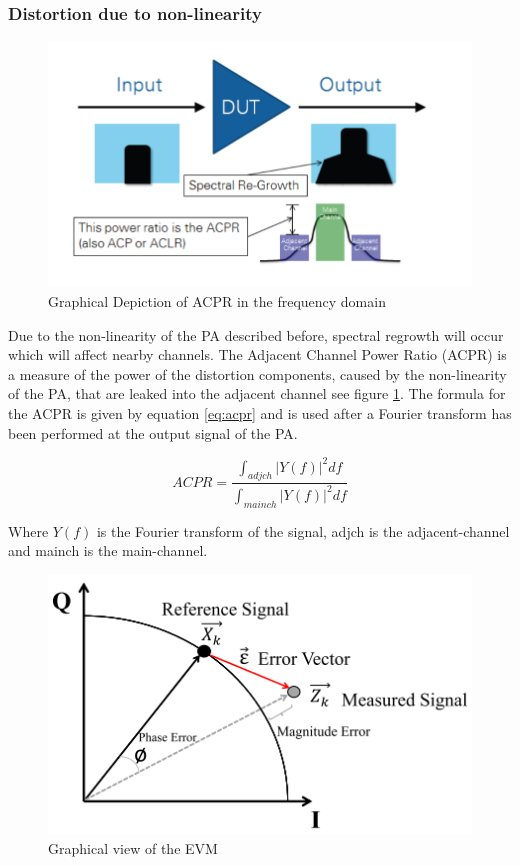 \subsubsection{Distortion due to non-linearity}

\begin{figure}[H]
\centering 
\includegraphics[scale = 0.5]{figures/ch1/acpr.png}
\caption{Graphical Depiction of ACPR in the frequency domain \citep{NI}}
\label{fig:acpr}
\end{figure}

Due to the non-linearity of the PA described before, spectral regrowth will occur which will affect nearby channels. The Adjacent Channel Power Ratio (ACPR) is a measure of the power of the distortion components, caused by the non-linearity of the PA, that are leaked into the adjacent channel see figure \ref{fig:acpr}. The formula for the ACPR is given by equation \ref{eq:acpr} and is used after a Fourier transform has been performed at the output signal of the PA.

\begin{equation} \label{eq:acpr}
	ACPR = \frac{\int_{adjch}^{} |Y(f)|^2 df }{\int_{mainch}^{} |Y(f)|^2 df}
\end{equation}   

Where $Y(f)$ is the Fourier transform of the signal, adjch is the adjacent-channel and mainch is the main-channel. 

\begin{figure}[H]
\centering 
\includegraphics[scale = 0.8]{figures/ch1/evm.png}
\caption{Graphical view of the EVM}
\label{fig:evm}
\end{figure}
  

